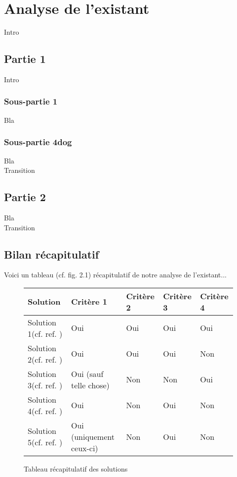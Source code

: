 \chapter{Analyse de l'existant}

Intro

\section{Partie 1}

Intro

\subsection{Sous-partie 1}

Bla

\subsection{Sous-partie 4dog}

Bla\\

Transition

\section{Partie 2}

Bla\\

Transition

\section{Bilan récapitulatif}

Voici un tableau (cf. fig. 2.1) récapitulatif de notre analyse de l'existant...\\

\begin{figure}[!h]
\begin{center}
\begin{tabular}{|l|l|l|l|l|}
  \hline
  Solution & Critère 1 & Critère 2 & Critère 3 & Critère 4\\
  \hline
  Solution 1(cf. ref. \cite{cite0}) & Oui & Oui & Oui & Oui \\
  Solution 2(cf. ref. \cite{cite1}) & Oui & Oui & Oui & Non \\
  Solution 3(cf. ref. \cite{cite2}) & Oui (sauf telle chose) & Non & Non & Oui\\
  Solution 4(cf. ref. \cite{cite3}) & Oui& Non & Oui & Non\\
  Solution 5(cf. ref. \cite{cite4}) & Oui (uniquement ceux-ci) & Non & Oui & Non\\
  \hline
\end{tabular}
\end{center}
\caption{Tableau récapitulatif des solutions}
\end{figure}
